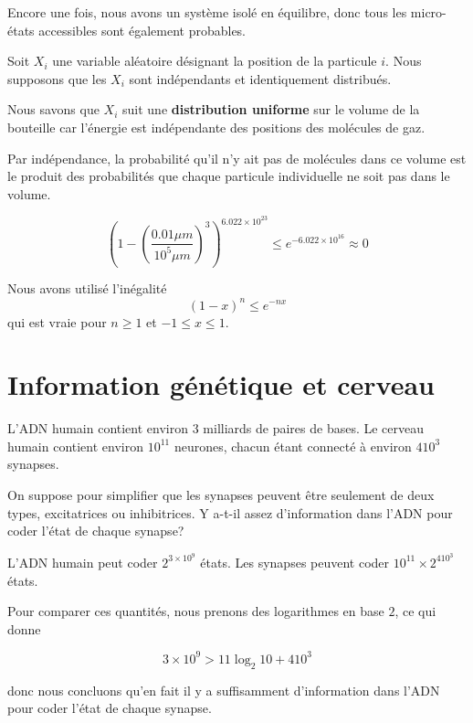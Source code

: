 \documentclass[french]{article}
\begin{document}
	Encore une fois, nous avons un système isolé en équilibre, donc tous les micro-états accessibles sont également probables.
	
	Soit \(X_i\) une variable aléatoire désignant la position de la particule \(i\). Nous supposons que les \(X_i\) sont indépendants et identiquement distribués.
	
	Nous savons que \(X_i\) suit une \textbf{distribution uniforme} sur le volume de la bouteille car l'énergie est indépendante des positions des molécules de gaz.
	
	Par indépendance, la probabilité qu'il n'y ait pas de molécules dans ce volume est le produit des probabilités que chaque particule individuelle ne soit pas dans le volume.
	
	\[ \left( 1 - \left(\frac{0.01 \mu m}{10^5 \mu m}\right)^3 \right)^{6.022 \times 10^{23}} \leq e^{-6.022 \times 10^{16}} \approx 0 \]
	
	\begin{tcolorbox}[colback=yellow!5!white,colframe=yellow!75!black]
		Nous avons utilisé l'inégalité
		\[ (1-x)^n \leq e^{-nx} \]
		qui est vraie pour \( n \geq 1\) et \( -1 \leq x \leq 1 \).
	\end{tcolorbox}

	\section{Information génétique et cerveau}
	\begin{tcolorbox}[colback=blue!5!white,colframe=blue!75!black]
		\quad L'ADN humain contient environ $3$ milliards de paires de bases. Le cerveau humain contient environ $10^{11}$ neurones, chacun étant connecté à environ 	$410^3$ synapses.
		
		\quad On suppose pour simplifier que les synapses peuvent être seulement de deux types, excitatrices ou inhibitrices. Y a-t-il assez d'information dans l'ADN pour coder l'état de chaque synapse?
	\end{tcolorbox}
	
	L'ADN humain peut coder \(2^{3 \times 10^9}\) états. Les synapses peuvent coder \(10^{11} \times 2^{410^3}\) états.
	
	Pour comparer ces quantités, nous prenons des logarithmes en base \(2\), ce qui donne
	
	\[ 3 \times 10^9 > 11 \log_{2} 10 + 410^3 \]
	
	donc nous concluons qu'en fait il y a suffisamment d'information dans l'ADN pour coder l'état de chaque synapse.
	
	
\end{document}
